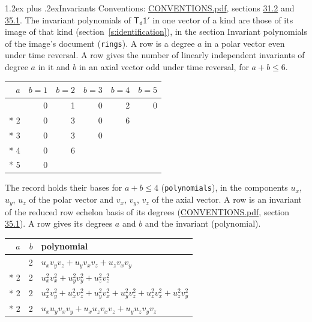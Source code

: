\documentclass[10pt,a4paper]{article}
\makeatletter
\renewcommand\section{\@startsection{section}{1}{\z@}{-3ex plus -1ex minus -.2ex}%
  {1.2ex plus .2ex}{\normalfont\large\sffamily\bfseries\color{parttitle}}}
\numberwithin{equation}{section}
\newcommand{\grp}[1]{\mathsf{#1}}
\makeatother
\begin{document}
\section{Invariants}\label{s:invariants}
Conventions: \href{../../CONVENTIONS.pdf}{CONVENTIONS.pdf}, sections \href{../../CONVENTIONS.pdf\#conv.31.2}{31.2} and \href{../../CONVENTIONS.pdf\#conv.35.1}{35.1}.
The invariant polynomials of $\grp{T_{d}1'}$ in one vector of a kind are those of its image of that kind (section~\ref{s:identification}), in the section Invariant polynomials of the image's document (\texttt{rings}).
\leavevmode\label{n:index.degree.polar}\label{n:index.degree.axial}A row is a degree $a$ in a polar vector even under time reversal. A row gives the number of linearly independent invariants of degree $a$ in it and $b$ in an axial vector odd under time reversal, for $a + b \le 6$.
{\small\begin{longtable}{@{}rrrrrr@{}}\toprule
$a$ & $b = 1$ & $b = 2$ & $b = 3$ & $b = 4$ & $b = 5$\\\midrule\endhead
\bottomrule\endfoot\endlastfoot
1 & 0 & 1 & 0 & 2 & 0\\*
2 & 0 & 3 & 0 & 6 & \\*
3 & 0 & 3 & 0 &  & \\*
4 & 0 & 6 &  &  & \\*
5 & 0 &  &  &  & \\
\bottomrule\end{longtable}}
\leavevmode\label{n:local.component.polar}\label{n:local.component.axial}The record holds their bases for $a + b \le 4$ (\texttt{polynomials}), in the components $u_{x}$, $u_{y}$, $u_{z}$ of the polar vector and $v_{x}$, $v_{y}$, $v_{z}$ of the axial vector. \label{n:head.polynomial}A row is an invariant of the reduced row echelon basis of its degrees (\href{../../CONVENTIONS.pdf}{CONVENTIONS.pdf}, section \href{../../CONVENTIONS.pdf\#conv.35.1}{35.1}). A row gives its degrees $a$ and $b$ and the invariant (polynomial).
{\small\renewcommand{\arraystretch}{1.2}\begin{longtable}{@{}rrl@{}}\toprule
$a$ & $b$ & polynomial\\\midrule\endhead
\bottomrule\endfoot\endlastfoot
1 & 2 & $u_{x}v_{y}v_{z} + u_{y}v_{x}v_{z} + u_{z}v_{x}v_{y}$\\*
2 & 2 & $u_{x}^{2}v_{x}^{2} + u_{y}^{2}v_{y}^{2} + u_{z}^{2}v_{z}^{2}$\\*
2 & 2 & $u_{x}^{2}v_{y}^{2} + u_{x}^{2}v_{z}^{2} + u_{y}^{2}v_{x}^{2} + u_{y}^{2}v_{z}^{2} + u_{z}^{2}v_{x}^{2} + u_{z}^{2}v_{y}^{2}$\\*
2 & 2 & $u_{x}u_{y}v_{x}v_{y} + u_{x}u_{z}v_{x}v_{z} + u_{y}u_{z}v_{y}v_{z}$\\
\bottomrule\end{longtable}}
\end{document}
